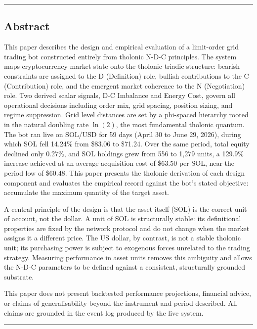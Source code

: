 \documentclass[
  11pt,
  letterpaper,
]{article}
\begin{document}
\begin{center}\rule{0.5\linewidth}{0.5pt}\end{center}

\subsection{Abstract}\label{abstract}

This paper describes the design and empirical evaluation of a
limit-order grid trading bot constructed entirely from tholonic N-D-C
principles. The system maps cryptocurrency market state onto the
tholonic triadic structure: bearish constraints are assigned to the D
(Definition) role, bullish contributions to the C (Contribution) role,
and the emergent market coherence to the N (Negotiation) role. Two
derived scalar signals, D-C Imbalance and Energy Cost, govern all
operational decisions including order mix, grid spacing, position
sizing, and regime suppression. Grid level distances are set by a
phi-spaced hierarchy rooted in the natural doubling rate \(\ln(2)\), the
most fundamental tholonic quantum. The bot ran live on SOL/USD for 59
days (April 30 to June 29, 2026), during which SOL fell 14.24\% from
\$83.06 to \$71.24. Over the same period, total equity declined only
0.27\%, and SOL holdings grew from 556 to 1,279 units, a 129.9\%
increase achieved at an average acquisition cost of \$63.50 per SOL,
near the period low of \$60.48. This paper presents the tholonic
derivation of each design component and evaluates the empirical record
against the bot's stated objective: accumulate the maximum quantity of
the target asset.

A central principle of the design is that the asset itself (SOL) is the
correct unit of account, not the dollar. A unit of SOL is structurally
stable: its definitional properties are fixed by the network protocol
and do not change when the market assigns it a different price. The US
dollar, by contrast, is not a stable tholonic unit; its purchasing power
is subject to exogenous forces unrelated to the trading strategy.
Measuring performance in asset units removes this ambiguity and allows
the N-D-C parameters to be defined against a consistent, structurally
grounded substrate.

This paper does not present backtested performance projections,
financial advice, or claims of generalisability beyond the instrument
and period described. All claims are grounded in the event log produced
by the live system.

\begin{center}\rule{0.5\linewidth}{0.5pt}\end{center}
\end{document}
